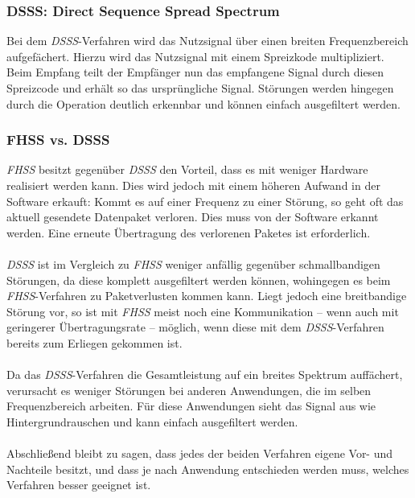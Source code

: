         \subsubsection{DSSS: Direct Sequence Spread Spectrum}\label{DSSS}
            Bei dem \textsl{DSSS}-Verfahren wird das Nutzsignal über einen breiten Frequenzbereich
            aufgefächert. Hierzu wird das Nutzsignal mit einem Spreizkode multipliziert. 
            Beim Empfang teilt der Empfänger nun das empfangene Signal durch diesen Spreizcode
            und erhält so das ursprüngliche Signal. Störungen werden hingegen durch die 
            Operation deutlich erkennbar und können einfach ausgefiltert werden.
        \subsubsection{FHSS vs. DSSS}\label{FHSSvsDSSS}
            \textsl{FHSS} besitzt gegenüber \textsl{DSSS} den Vorteil, dass es mit weniger Hardware
            realisiert werden kann. 
            Dies wird jedoch mit einem höheren Aufwand in der Software erkauft: Kommt es auf einer
            Frequenz zu einer Störung, so geht oft das aktuell gesendete Datenpaket verloren.
            Dies muss von der Software erkannt werden. Eine erneute Übertragung des verlorenen
            Paketes ist erforderlich.\\
            \\
            \textsl{DSSS} ist im Vergleich zu \textsl{FHSS} weniger anfällig gegenüber
            schmallbandigen Störungen, da diese komplett ausgefiltert werden können, 
            wohingegen es beim \textsl{FHSS}-Verfahren zu Paketverlusten kommen kann.
            Liegt jedoch eine breitbandige Störung vor, so ist mit \textsl{FHSS}
            meist noch eine Kommunikation -- wenn auch mit geringerer Übertragungsrate -- 
            möglich, wenn diese mit dem \textsl{DSSS}-Verfahren bereits zum Erliegen gekommen ist.\\
            \\
            Da das \textsl{DSSS}-Verfahren die Gesamtleistung auf ein breites Spektrum auffächert,
            verursacht es weniger Störungen bei anderen Anwendungen, die im selben Frequenzbereich
            arbeiten. Für diese Anwendungen sieht das Signal aus wie Hintergrundrauschen und kann
            einfach ausgefiltert werden.\\
            \\
            Abschließend bleibt zu sagen, dass jedes der beiden Verfahren eigene Vor- und Nachteile
            besitzt, und dass je nach Anwendung entschieden werden muss, welches Verfahren
            besser geeignet ist.

